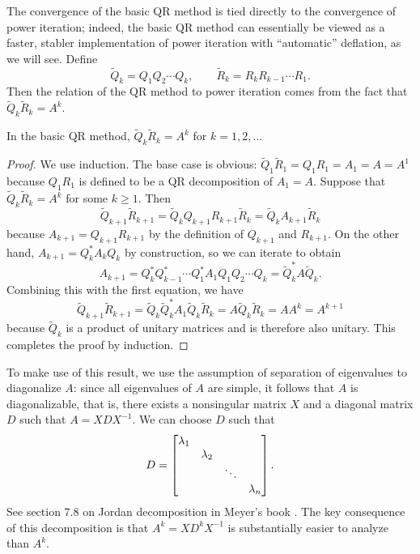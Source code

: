 \documentclass{article}
\newcommand{\Qt}{\widetilde{Q}}
\newcommand{\Rt}{\widetilde{R}}
\begin{document}
The convergence of the basic QR method is tied directly to the convergence of power iteration; indeed, the basic QR method can essentially be viewed as a faster, stabler implementation of power iteration with ``automatic'' deflation, as we will see. Define
\begin{equation}
	\Qt_k = Q_{1}Q_2\cdots Q_k, \qquad \Rt_k = R_kR_{k-1}\cdots R_1.
\end{equation}
Then the relation of the QR method to power iteration comes from the fact that $\Qt_k\Rt_k = A^k$.
\begin{lemma}
	\label{lemma:power}
	In the basic QR method, $\Qt_k\Rt_k = A^k$ for $k = 1,2,\dots$
\end{lemma}
\begin{proof}
	We use induction. The base case is obvious: $\Qt_1\Rt_1 = Q_1R_1 = A_1 = A=A^1$ because $Q_1R_1$ is defined to be a QR decomposition of $A_1 = A$. Suppose that $\Qt_k\Rt_k = A^k$ for some $k \ge 1$. Then 
	\begin{equation*}
		\Qt_{k+1}\Rt_{k+1} = \Qt_{k}Q_{k+1}R_{k+1}\Rt_{k} = \Qt_kA_{k+1}\Rt_{k}
	\end{equation*}
	because $A_{k+1} = Q_{k+1}R_{k+1}$ by the definition of $Q_{k+1}$ and $R_{k+1}$.
	On the other hand, $A_{k+1} = Q_k^*A_kQ_k$ by construction, so we can iterate to obtain
	\begin{equation*}
		A_{k+1} = Q_k^*Q_{k-1}^*\cdots Q_1^*A_1Q_1Q_2\cdots Q_k = \Qt_k^*A\Qt_k.
	\end{equation*}
	Combining this with the first equation, we have
	\begin{equation*}
		\Qt_{k+1}\Rt_{k+1} = \Qt_k\Qt_k^*A_1\Qt_k\Rt_k = A\Qt_k\Rt_k = AA^k = A^{k+1}
	\end{equation*}
	because $\Qt_k$ is a product of unitary matrices and is therefore also unitary. This completes the proof by induction.
\end{proof}
To make use of this result, we use the assumption of separation of eigenvalues to diagonalize $A$: since all eigenvalues of $A$ are simple, it follows that $A$ is diagonalizable, that is, there exists a nonsingular matrix $X$ and a diagonal matrix $D$ such that $A = XDX^{-1}$. We can choose $D$ such that
\begin{equation*}
	D = \left[\begin{matrix}\lambda_1\\ & \lambda_2 \\ & & \ddots \\ &  & & \lambda_n\end{matrix}\right].
\end{equation*}
See section 7.8 on Jordan decomposition in Meyer's book \cite{meyer_2008}. The key consequence of this decomposition is that $A^k = XD^kX^{-1}$ is substantially easier to analyze than $A^k$.
\end{document}

